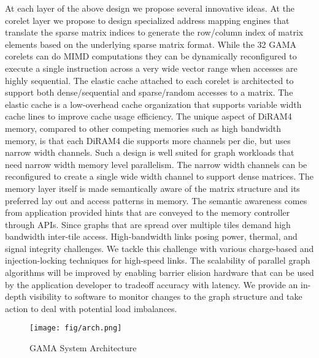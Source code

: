 At each layer of the above design we propose several innovative ideas. At the corelet layer we propose to design specialized address mapping engines that translate the sparse matrix indices to generate the row/column index of matrix elements based on the underlying sparse matrix format. While the 32 GAMA corelets can do MIMD computations they can  be dynamically reconfigured to execute a single instruction across a very wide vector range when accesses are highly sequential.  The elastic  cache attached to each corelet is architected to support both dense/sequential and sparse/random accesses to a matrix. The elastic cache is a low-overhead cache organization that supports variable width cache lines to improve cache usage efficiency.  
 The unique aspect of DiRAM4 memory, compared to other competing memories such as high bandwidth memory, is that each DiRAM4 die supports more channels per die, but uses narrow width channels. Such a design is well suited for graph workloads that need narrow width memory level parallelism. The narrow width channels can be reconfigured to create a single wide width channel to support dense matrices. The memory layer itself is made semantically aware of the matrix structure and its preferred lay out and access patterns in memory. The semantic awareness comes from application provided hints that are conveyed to the memory controller through APIs. Since graphs that are spread over multiple tiles demand high bandwidth inter-tile access. High-bandwidth links  posing power, thermal, and signal integrity challenges.  We tackle this challenge with various charge-based and injection-locking techniques for high-speed links. The scalability of parallel graph algorithms will be improved by enabling barrier elision hardware that can be used by the application developer to tradeoff accuracy with latency. We provide an in-depth visibility to software to monitor changes to the graph structure and take action to deal with potential load imbalances.  
\begin{figure}
\center
\texttt{[image: fig/arch.png]}
\caption{GAMA System Architecture}
\label{fig:arch}
\end{figure}


